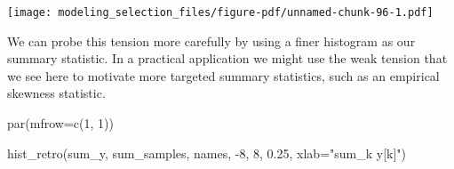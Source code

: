 \documentclass[
  letterpaper,
  DIV=11,
  numbers=noendperiod]{scrartcl}
\newenvironment{Shaded}{\begin{snugshade}}{\end{snugshade}}
\newcommand{\AttributeTok}[1]{\textcolor[rgb]{0.40,0.45,0.13}{#1}}
\newcommand{\ControlFlowTok}[1]{\textcolor[rgb]{0.00,0.23,0.31}{#1}}
\newcommand{\DecValTok}[1]{\textcolor[rgb]{0.68,0.00,0.00}{#1}}
\newcommand{\FloatTok}[1]{\textcolor[rgb]{0.68,0.00,0.00}{#1}}
\newcommand{\FunctionTok}[1]{\textcolor[rgb]{0.28,0.35,0.67}{#1}}
\newcommand{\NormalTok}[1]{\textcolor[rgb]{0.00,0.23,0.31}{#1}}
\newcommand{\OtherTok}[1]{\textcolor[rgb]{0.00,0.23,0.31}{#1}}
\newcommand{\SpecialCharTok}[1]{\textcolor[rgb]{0.37,0.37,0.37}{#1}}
\newcommand{\StringTok}[1]{\textcolor[rgb]{0.13,0.47,0.30}{#1}}
\begin{document}
\begin{Shaded}
\end{Shaded}

\texttt{[image: modeling\_selection\_files/figure-pdf/unnamed-chunk-96-1.pdf]}

We can probe this tension more carefully by using a finer histogram as
our summary statistic. In a practical application we might use the weak
tension that we see here to motivate more targeted summary statistics,
such as an empirical skewness statistic.

\begin{Shaded}
\begin{Highlighting}[]
\FunctionTok{par}\NormalTok{(}\AttributeTok{mfrow=}\FunctionTok{c}\NormalTok{(}\DecValTok{1}\NormalTok{, }\DecValTok{1}\NormalTok{))}

\FunctionTok{hist\_retro}\NormalTok{(sum\_y, sum\_samples, names, }\SpecialCharTok{{-}}\DecValTok{8}\NormalTok{, }\DecValTok{8}\NormalTok{, }\FloatTok{0.25}\NormalTok{, }\AttributeTok{xlab=}\StringTok{"sum\_k y[k]"}\NormalTok{)}
\end{Highlighting}
\end{Shaded}
\end{document}
